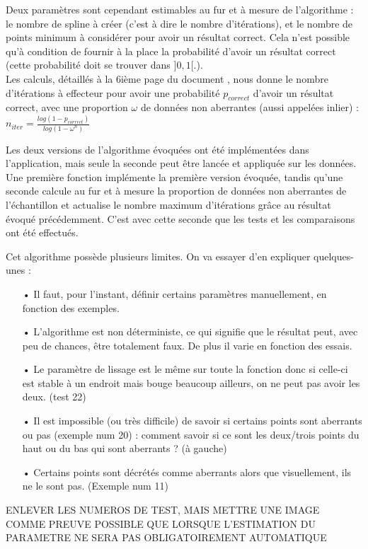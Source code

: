 \documentclass[a4paper,12pt]{article} %
\begin{document}
                    Deux paramètres sont cependant estimables au fur et à mesure de l'algorithme :\\ le nombre de spline à créer (c'est à dire le nombre d'itérations), et le nombre de points minimum à considérer pour avoir un résultat correct. Cela n'est possible qu'à condition de fournir à la place la probabilité d'avoir un résultat correct (cette probabilité doit se trouver dans $]0,1[$.). \\
                    Les calculs, détaillés à la 6ième page du document \cite{RANSAC}, nous donne le nombre d'itérations à effecteur pour avoir une probabilité $p_{correct}$ d'avoir un résultat correct, avec une proportion $\omega$ de données non aberrantes (aussi appelées inlier) : $n_{iter} = \frac{log(1 - p_{correct})}{log(1 - \omega^n)}$
                    
                    Les deux versions de l'algorithme évoquées ont été implémentées dans l'application, mais seule la seconde peut être lancée et appliquée sur les données.
                    Une première fonction implémente la première version évoquée, tandis qu'une seconde calcule au fur et à mesure la proportion de données non aberrantes de l'échantillon et actualise le nombre maximum d'itérations grâce au résultat évoqué précédemment.
                    C'est avec cette seconde que les tests et les comparaisons ont été effectués.
                    
                    Cet algorithme possède plusieurs limites. On va essayer d'en expliquer quelques-unes :
                    \begin{itemize}
                    \item[•] Il faut, pour l'instant, définir certains paramètres manuellement, en fonction des exemples.
                    \item[•] L'algorithme est non déterministe, ce qui signifie que le résultat peut, avec peu de chances, être totalement faux. De plus il varie en fonction des essais.
                    \item[•] Le paramètre de lissage est le même sur toute la fonction donc si celle-ci est stable à un endroit mais bouge beaucoup ailleurs, on ne peut pas avoir les deux. (test 22)
                    \item[•] Il est impossible (ou très difficile) de savoir si certains points sont aberrants ou pas (exemple num 20) : comment savoir si ce sont les deux/trois points du haut ou du bas qui sont aberrants ? (à gauche)
                    \item[•] Certains points sont décrétés comme aberrants alors que visuellement, ils ne le sont pas. (Exemple num 11)\\
                    \end{itemize}
                    ENLEVER LES NUMEROS DE TEST, MAIS METTRE UNE IMAGE COMME PREUVE
                   POSSIBLE QUE LORSQUE L'ESTIMATION DU PARAMETRE NE SERA PAS OBLIGATOIREMENT AUTOMATIQUE
                    
\end{document}
